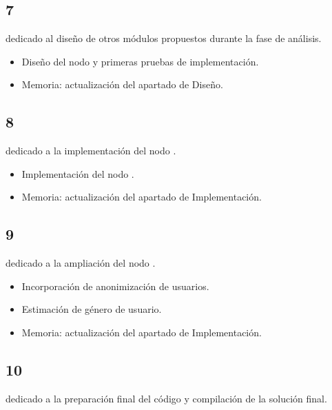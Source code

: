 \subsection{ 7}

 dedicado al diseño de otros módulos propuestos durante la fase de análisis. 

\begin{itemize}
	\item Diseño del nodo  y primeras pruebas de implementación. 
	\item Memoria: actualización del apartado de Diseño.
\end{itemize}


\subsection{ 8}

 dedicado a la implementación del nodo . 

\begin{itemize}
	\item Implementación del nodo . 
	\item Memoria: actualización del apartado de Implementación. 
\end{itemize}


\subsection{ 9}

 dedicado a la ampliación del nodo . 

\begin{itemize}
	\item Incorporación de anonimización de usuarios.
	\item Estimación de género de usuario. 
	\item Memoria: actualización del apartado de Implementación. 
\end{itemize}



\subsection{ 10}

 dedicado a la preparación final del código y compilación de la solución final. 

